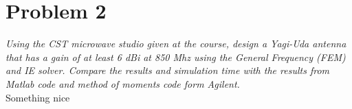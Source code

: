 \section{Problem 2}
\textit{Using the CST microwave studio given at the course, design a Yagi-Uda antenna that has a gain of at least 6 dBi at 850 Mhz using the General Frequency (FEM) and IE solver. Compare the results and simulation time with the results from Matlab code and method of moments code form Agilent.}\\

Something nice